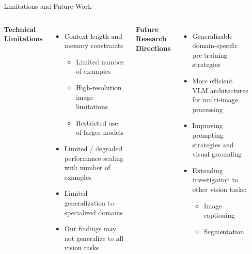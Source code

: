 \documentclass[aspectratio=169]{beamer}
\begin{document}
\begin{frame}{Limitations and Future Work}
    \begin{columns}[T]
            \textbf{Technical Limitations}
            \begin{itemize}
                \item Context length and memory constraints
                \begin{itemize}
                    \item Limited number of examples
                    \item High-resolution image limitations
                    \item Restricted use of larger models
                \end{itemize}
                \item Limited / degraded performance scaling with number of examples
                \item Limited generalization to specialized domains
                \item Our findings may not generalize to all vision tasks
            \end{itemize}
            \textbf{Future Research Directions}
            \begin{itemize}
                \item Generalizable domain-specific pre-training strategies
                \item More efficient VLM architectures for multi-image processing
                \item Improving prompting strategies and visual grounding~
                \item Extending investigation to other vision tasks:
                \begin{itemize}
                    \item Image captioning
                    \item Segmentation
                \end{itemize}
            \end{itemize}
    \end{columns}
\end{frame}
\end{document}
